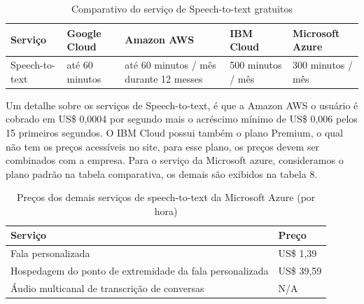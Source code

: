 \documentclass{article}
\begin{document}
\begin{table}[!!ht]
 \caption{Comparativo do serviço de Speech-to-text gratuitos}
  \centering
  \begin{tabular}{lllll}
    \cmidrule(r){1-5}
    Serviço & Google Cloud & Amazon AWS & IBM Cloud & Microsoft Azure \\
    \midrule
    Speech-to-text & até 60 minutos & até 60 minutos / mês durante 12 messes & 500 minutos / mês & 300 minutos / mês \\
    \bottomrule
  \end{tabular}
  \label{tab:table9}
\end{table}

Um detalhe sobre os serviços de Speech-to-text, é que a Amazon AWS o usuário é cobrado em US\$ 0,0004 por segundo mais o acréscimo mínimo de US\$ 0,006 pelos 15 primeiros segundos. O IBM Cloud possui também o plano Premium, o qual não tem os preços acessíveis no site, para esse plano, os preços devem ser combinados com a empresa. Para o serviço da Microsoft azure, consideramos o plano padrão na tabela comparativa, os demais são exibidos na tabela 8.

\begin{table}[!!ht]
 \caption{Preços dos demais serviços de speech-to-text da Microsoft Azure (por hora)}
  \centering
  \begin{tabular}{ll}
    \cmidrule(r){1-2}
    Serviço & Preço \\
    \midrule
    Fala personalizada & US\$ 1,39\\ %
    Hospedagem do ponto de extremidade da fala personalizada & US\$ 39,59 \\ %
    Áudio multicanal de transcrição de conversas & N/A \\
    \bottomrule
  \end{tabular}
  \label{tab:table10}
\end{table}
\end{document}
